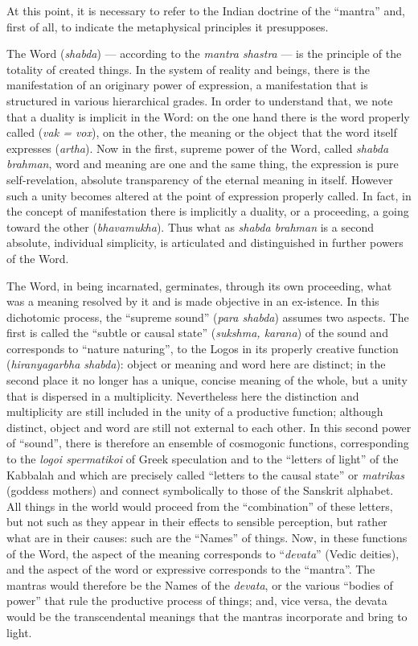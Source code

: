 At this point, it is necessary to refer to the Indian doctrine of the “mantra” and, first of all, to indicate the metaphysical principles it presupposes.

The Word (\textit{shabda}) — according to the \textit{mantra shastra} — is the principle of the totality of created things. In the system of reality and beings, there is the manifestation of an originary power of expression, a manifestation that is structured in various hierarchical grades. In order to understand that, we note that a duality is implicit in the Word: on the one hand there is the word properly called (\textit{vak = vox}), on the other, the meaning or the object that the word itself expresses (\textit{artha}). Now in the first, supreme power of the Word, called \textit{shabda brahman}, word and meaning are one and the same thing, the expression is pure self-revelation, absolute transparency of the eternal meaning in itself. However such a unity becomes altered at the point of expression properly called. In fact, in the concept of manifestation there is implicitly a duality, or a proceeding, a going toward the other (\textit{bhavamukha}). Thus what as \textit{shabda brahman} is a second absolute, individual simplicity, is articulated and distinguished in further powers of the Word.

The Word, in being incarnated, germinates, through its own proceeding, what was a meaning resolved by it and is made objective in an ex-istence. In this dichotomic process, the “supreme sound” (\textit{para shabda}) assumes two aspects. The first is called the “subtle or causal state” (\textit{sukshma, karana}) of the sound and corresponds to “nature naturing”, to the Logos in its properly creative function (\textit{hiranyagarbha shabda}): object or meaning and word here are distinct; in the second place it no longer has a unique, concise meaning of the whole, but a unity that is dispersed in a multiplicity. Nevertheless here the distinction and multiplicity are still included in the unity of a productive function; although distinct, object and word are still not external to each other. In this second power of “sound”, there is therefore an ensemble of cosmogonic functions, corresponding to the \textit{logoi spermatikoi} of Greek speculation and to the “letters of light” of the Kabbalah and which are precisely called “letters to the causal state” or \textit{matrikas} (goddess mothers) and connect symbolically to those of the Sanskrit alphabet. All things in the world would proceed from the “combination” of these letters, but not such as they appear in their effects to sensible perception, but rather what are in their causes: such are the “Names” of things. Now, in these functions of the Word, the aspect of the meaning corresponds to “\textit{devata}” (Vedic deities), and the aspect of the word or expressive corresponds to the “mantra”. The mantras would therefore be the Names of the \textit{devata}, or the various “bodies of power” that rule the productive process of things; and, vice versa, the devata would be the transcendental meanings that the mantras incorporate and bring to light.

